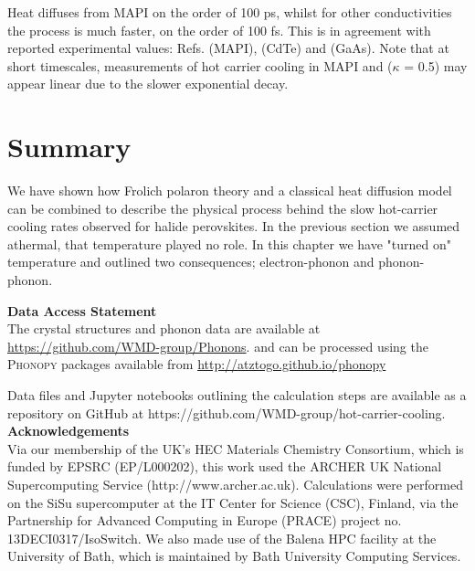 Heat diffuses from MAPI on the order of 100 ps, whilst for other conductivities the process is much faster, on the order of 100 fs. 
This is in agreement with reported experimental values: Refs. \cite{Klein2016} (MAPI), \cite{Zhong2017} (CdTe) and \cite{Rosenwaks1993} (GaAs). 
Note that at short timescales, measurements of hot carrier cooling in MAPI and ($\kappa$ = 0.5) may appear linear due to the slower exponential decay.

\section{Summary}

We have shown how Fr{\:o}lich polaron theory and a classical heat diffusion model can be combined to
describe the physical process behind the slow hot-carrier cooling rates
observed for halide perovskites.
In the previous section we assumed athermal, that temperature played no role. In this chapter we have "turned on" temperature and outlined two consequences; electron-phonon and phonon-phonon.

\textbf{Data Access Statement}\\
The crystal structures and phonon data are available at \url{https://github.com/WMD-group/Phonons}. 
and can be processed using the \textsc{Phonopy} packages available from \url{http://atztogo.github.io/phonopy} 

Data files and Jupyter notebooks outlining the calculation steps are available as a repository on GitHub at https://github.com/WMD-group/hot-carrier-cooling.
\textbf{Acknowledgements}\\
Via our membership of the UK's HEC Materials Chemistry Consortium, which is funded by EPSRC (EP/L000202), this work used the ARCHER UK National Supercomputing Service (http://www.archer.ac.uk).
Calculations were performed on the SiSu supercomputer at the IT Center for Science (CSC), Finland, via the Partnership for Advanced Computing in Europe (PRACE) project no. 13DECI0317/IsoSwitch. We also made use of the Balena HPC facility at the University of Bath, which is maintained by Bath University Computing Services.


